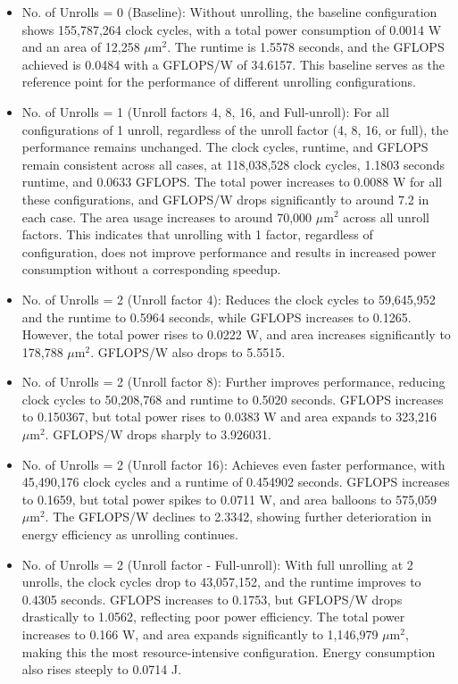\begin{itemize}
    \item No. of Unrolls = 0 (Baseline): Without unrolling, the baseline configuration shows 155,787,264 clock cycles, with a total power consumption of 0.0014 W and an area of 12,258 $\mu\text{m}^2$. The runtime is 1.5578 seconds, and the GFLOPS achieved is 0.0484 with a GFLOPS/W of 34.6157. This baseline serves as the reference point for the performance of different unrolling configurations.
    \item No. of Unrolls = 1 (Unroll factors 4, 8, 16, and Full-unroll): For all configurations of 1 unroll, regardless of the unroll factor (4, 8, 16, or full), the performance remains unchanged. The clock cycles, runtime, and GFLOPS remain consistent across all cases, at 118,038,528 clock cycles, 1.1803 seconds runtime, and 0.0633 GFLOPS. The total power increases to 0.0088 W for all these configurations, and GFLOPS/W drops significantly to around 7.2 in each case. The area usage increases to around 70,000 $\mu\text{m}^2$ across all unroll factors. This indicates that unrolling with 1 factor, regardless of configuration, does not improve performance and results in increased power consumption without a corresponding speedup.
    \item No. of Unrolls = 2 (Unroll factor 4): Reduces the clock cycles to 59,645,952 and the runtime to 0.5964 seconds, while GFLOPS increases to 0.1265. However, the total power rises to 0.0222 W, and area increases significantly to 178,788 $\mu\text{m}^2$. GFLOPS/W also drops to 5.5515.
    \item No. of Unrolls = 2 (Unroll factor 8): Further improves performance, reducing clock cycles to 50,208,768 and runtime to 0.5020 seconds. GFLOPS increases to 0.150367, but total power rises to 0.0383 W and area expands to 323,216 $\mu\text{m}^2$. GFLOPS/W drops sharply to 3.926031.
    \item No. of Unrolls = 2 (Unroll factor 16): Achieves even faster performance, with 45,490,176 clock cycles and a runtime of 0.454902 seconds. GFLOPS increases to 0.1659, but total power spikes to 0.0711 W, and area balloons to 575,059 $\mu\text{m}^2$. The GFLOPS/W declines to 2.3342, showing further deterioration in energy efficiency as unrolling continues.
    \item No. of Unrolls = 2 (Unroll factor - Full-unroll): With full unrolling at 2 unrolls, the clock cycles drop to 43,057,152, and the runtime improves to 0.4305 seconds. GFLOPS increases to 0.1753, but GFLOPS/W drops drastically to 1.0562, reflecting poor power efficiency. The total power increases to 0.166 W, and area expands significantly to 1,146,979 $\mu\text{m}^2$, making this the most resource-intensive configuration. Energy consumption also rises steeply to 0.0714 J.
    
\end{itemize}

